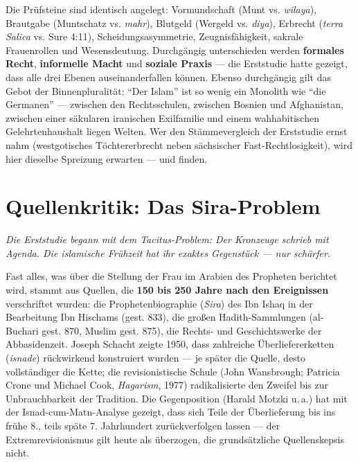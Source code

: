 \documentclass[11pt,a4paper,ngerman]{scrartcl}
\newcommand{\chipbase}[2]{\hspace{0pt}{\footnotesize\textcolor{#1}{[\textsc{#2}]}}}
\newcommand{\chipbelegt}[1]{\chipbase{chipgreen}{#1}}
\newcommand{\chipumstritten}[1]{\chipbase{chipred}{#1}}
\begin{document}
Die Prüfsteine sind identisch angelegt: Vormundschaft (Munt vs. \emph{wilaya}), Brautgabe (Muntschatz vs. \emph{mahr}), Blutgeld (Wergeld vs. \emph{diya}), Erbrecht (\emph{terra Salica} vs. Sure 4:11), Scheidungsasymmetrie, Zeugnisfähigkeit, sakrale Frauenrollen und Wesensdeutung. Durchgängig unterschieden werden \textbf{formales Recht}, \textbf{informelle Macht} und \textbf{soziale Praxis} --- die Erststudie hatte gezeigt, dass alle drei Ebenen auseinanderfallen können. Ebenso durchgängig gilt das Gebot der Binnenpluralität: \enquote{Der Islam} ist so wenig ein Monolith wie \enquote{die Germanen} --- zwischen den Rechtsschulen, zwischen Bosnien und Afghanistan, zwischen einer säkularen iranischen Exilfamilie und einem wahhabitischen Gelehrtenhaushalt liegen Welten. Wer den Stämmevergleich der Erststudie ernst nahm (westgotisches Töchtererbrecht neben sächsischer Fast-Rechtlosigkeit), wird hier dieselbe Spreizung erwarten --- und finden. \chipbelegt{belegt}

\section{Quellenkritik: Das Sira-Problem}
\noindent\textit{Die Erststudie begann mit dem Tacitus-Problem: Der Kronzeuge schrieb mit Agenda. Die islamische Frühzeit hat ihr exaktes Gegenstück --- nur schärfer.}
\medskip

Fast alles, was über die Stellung der Frau im Arabien des Propheten berichtet wird, stammt aus Quellen, die \textbf{150 bis 250 Jahre nach den Ereignissen} verschriftet wurden: die Prophetenbiographie (\emph{Sira}) des Ibn Ishaq in der Bearbeitung Ibn Hischams (gest. 833), die großen Hadith-Sammlungen (al-Buchari gest. 870, Muslim gest. 875), die Rechts- und Geschichtswerke der Abbasidenzeit. Joseph Schacht zeigte 1950, dass zahlreiche Überliefererketten (\emph{isnade}) rückwirkend konstruiert wurden --- je später die Quelle, desto vollständiger die Kette; die revisionistische Schule (John Wansbrough; Patricia Crone und Michael Cook, \emph{Hagarism}, 1977) radikalisierte den Zweifel bis zur Unbrauchbarkeit der Tradition. \chipbelegt{belegt} Die Gegenposition (Harald Motzki u.\,a.) hat mit der Isnad-cum-Matn-Analyse gezeigt, dass sich Teile der Überlieferung bis ins frühe 8., teils späte 7. Jahrhundert zurückverfolgen lassen --- der Extremrevisionismus gilt heute als überzogen, die grundsätzliche Quellenskepsis nicht. \chipumstritten{umstritten}
\end{document}
